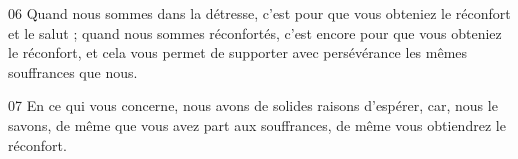 
06 Quand nous sommes dans la détresse, c’est pour que vous obteniez le réconfort et le salut ; quand nous sommes réconfortés, c’est encore pour que vous obteniez le réconfort, et cela vous permet de supporter avec persévérance les mêmes souffrances que nous.

07 En ce qui vous concerne, nous avons de solides raisons d’espérer, car, nous le savons, de même que vous avez part aux souffrances, de même vous obtiendrez le réconfort.
